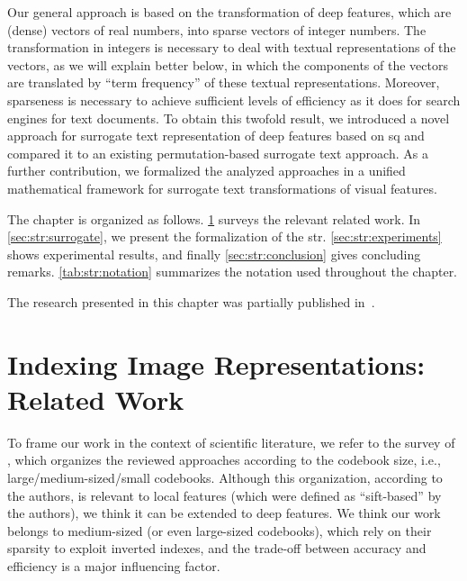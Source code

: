 Our general approach is based on the transformation of deep features, which are (dense) vectors of real numbers, into sparse vectors of integer numbers.
The transformation in integers is necessary to deal with textual representations of the vectors, as we will explain better below, in which the components of the vectors are translated by ``term frequency'' of these textual representations.
Moreover, sparseness is necessary to achieve sufficient levels of efficiency as it does for search engines for text documents.
To obtain this twofold result, we introduced a novel approach for surrogate text representation of deep features based on \acrfull{sq} and compared it to an existing permutation-based surrogate text approach.
As a further contribution, we formalized the analyzed approaches in a unified mathematical framework for surrogate text transformations of visual features.


The chapter is organized as follows.
\ref{sec:str:related-work} surveys the relevant related work.
In \ref{sec:str:surrogate}, we present the formalization of the \acrfull{str}.
\ref{sec:str:experiments} shows experimental results, and finally \ref{sec:str:conclusion} gives concluding remarks.
\ref{tab:str:notation} summarizes the notation used throughout the chapter.

The research presented in this chapter was partially published in~\cite{amato2017efficient,amato2018large}.

\section{Indexing Image Representations: Related Work}
\label{sec:str:related-work}
To frame our work in the context of scientific literature, we refer to the survey of \citet{zheng2018sift}, which organizes the reviewed approaches according to the codebook size, i.e., large/medium-sized/small codebooks.
Although this organization, according to the authors, is relevant to local features (which were defined as ``sift-based'' by the authors), we think it can be extended to deep features.
We think our work belongs to medium-sized (or even large-sized codebooks), which rely on their sparsity to exploit inverted indexes, and the trade-off between accuracy and efficiency is a major influencing factor.


